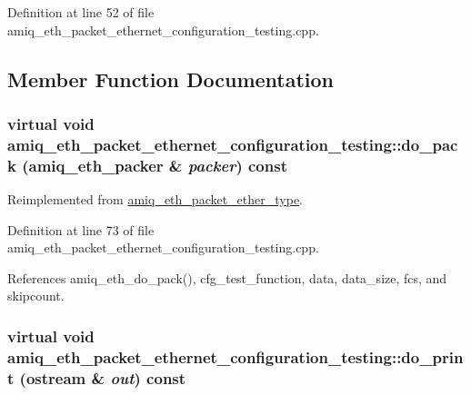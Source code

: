 Definition at line 52 of file amiq\_\-eth\_\-packet\_\-ethernet\_\-configuration\_\-testing.cpp.

\subsection{Member Function Documentation}
\hypertarget{classamiq__eth__packet__ethernet__configuration__testing_a4ae6c0485066d7661170544fa64c7e49}{
\subsubsection[{do\_\-pack}]{\setlength{\rightskip}{0pt plus 5cm}virtual void amiq\_\-eth\_\-packet\_\-ethernet\_\-configuration\_\-testing::do\_\-pack ({\bf amiq\_\-eth\_\-packer} \& {\em packer}) const}}
\label{classamiq__eth__packet__ethernet__configuration__testing_a4ae6c0485066d7661170544fa64c7e49}


Reimplemented from \hyperlink{classamiq__eth__packet__ether__type_a62fe5f26a466f0bd0045599b89aa6926}{amiq\_\-eth\_\-packet\_\-ether\_\-type}.

Definition at line 73 of file amiq\_\-eth\_\-packet\_\-ethernet\_\-configuration\_\-testing.cpp.

References amiq\_\-eth\_\-do\_\-pack(), cfg\_\-test\_\-function, data, data\_\-size, fcs, and skipcount.\hypertarget{classamiq__eth__packet__ethernet__configuration__testing_aaac4abb2c0104900e30360871e01bbbd}{
\subsubsection[{do\_\-print}]{\setlength{\rightskip}{0pt plus 5cm}virtual void amiq\_\-eth\_\-packet\_\-ethernet\_\-configuration\_\-testing::do\_\-print (ostream \& {\em out}) const}}
\label{classamiq__eth__packet__ethernet__configuration__testing_aaac4abb2c0104900e30360871e01bbbd}


